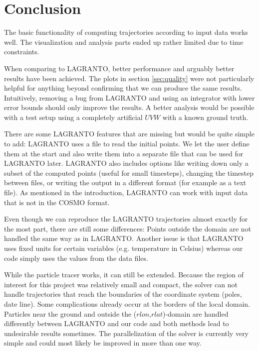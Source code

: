 \chapter{Conclusion}

The basic functionality of computing trajectories according to input data works well. The visualization and analysis parts ended up rather limited due to time constraints.

When comparing to LAGRANTO, better performance and arguably better results have been achieved. The plots in section \ref{sec:quality} were not particularly helpful for anything beyond confirming that we can produce the same results. Intuitively, removing a bug from LAGRANTO and using an integrator with lower error bounds should only improve the results. A better analysis would be possible with a test setup using a completely artificial $UVW$ with a known ground truth.

There are some LAGRANTO features that are missing but would be quite simple to add: LAGRANTO uses a file to read the initial points. We let the user define them at the start and also write them into a separate file that can be used for LAGRANTO later. LAGRANTO also includes options like writing down only a subset of the computed points (useful for small timesteps), changing the timestep between files, or writing the output in a different format (for example as a text file). As mentioned in the introduction, LAGRANTO can work with input data that is not in the COSMO format.

Even though we can reproduce the LAGRANTO trajectories almost exactly for the most part, there are still some differences: Points outside the domain are not handled the same way as in LAGRANTO. Another issue is that LAGRANTO uses fixed units for certain variables (e.g. temperature in Celsius) whereas our code simply uses the values from the data files.

While the particle tracer works, it can still be extended. Because the region of interest for this project was relatively small and compact, the solver can not handle trajectories that reach the boundaries of the coordinate system (poles, date line). Some complications already occur at the borders of the local domain. Particles near the ground and outside the ($rlon$,$rlat$)-domain are handled differently between LAGRANTO and our code and both methods lead to undesirable results sometimes. The parallelization of the solver is currently very simple and could most likely be improved in more than one way.

